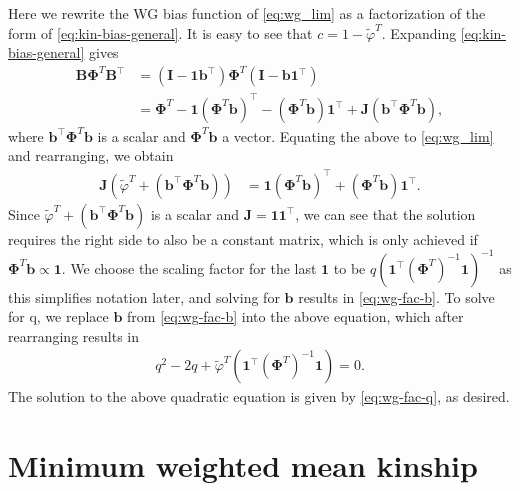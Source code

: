 \documentclass[9pt,twocolumn,twoside]{gsajnl}
\newcommand{\kinMat}[1][T]{\mathbf{\Phi}^{#1}}
\begin{document}
\begin{appendices}
  Here we rewrite the WG bias function of \cref{eq:wg_lim} as a factorization of the form of \cref{eq:kin-bias-general}.
  It is easy to see that $c = 1 - \tilde{\varphi}^T$.
  Expanding \cref{eq:kin-bias-general} gives
  \begin{align*}
    \mathbf{B} \kinMat \mathbf{B}^\intercal
    &= \left( \mathbf{I} - \mathbf{1} \mathbf{b}^\intercal \right) \kinMat \left( \mathbf{I} - \mathbf{b} \mathbf{1}^\intercal \right)
    \\
    &= \kinMat - \mathbf{1} \left( \kinMat \mathbf{b} \right)^\intercal - \left( \kinMat \mathbf{b} \right) \mathbf{1}^\intercal + \mathbf{J}(\mathbf{b}^\intercal \kinMat \mathbf{b} ),
  \end{align*} 
  where $\mathbf{b}^\intercal \kinMat \mathbf{b}$ is a scalar and $\kinMat\mathbf{b}$ a vector.
  Equating the above to \cref{eq:wg_lim} and rearranging, we obtain
  \begin{align*}
    \mathbf{J} \left( \tilde{\varphi}^T + \left( \mathbf{b}^\intercal \kinMat \mathbf{b} \right) \right)
    &= \mathbf{1} \left( \kinMat \mathbf{b} \right)^\intercal + \left( \kinMat\mathbf{b} \right) \mathbf{1}^\intercal .
  \end{align*}
  Since $\tilde{\varphi}^T + \left( \mathbf{b}^\intercal \kinMat \mathbf{b} \right)$ is a scalar and $\mathbf{J} = \mathbf{1} \mathbf{1}^\intercal$, we can see that the solution requires the right side to also be a constant matrix, which is only achieved if $\kinMat\mathbf{b} \propto \mathbf{1}$.
  We choose the scaling factor for the last $\mathbf{1}$ to be $q \left( \mathbf{1}^\intercal \left( \kinMat \right)^{-1} \mathbf{1} \right)^{-1}$ as this simplifies notation later, and solving for $\mathbf{b}$ results in \cref{eq:wg-fac-b}.
  To solve for q, we replace $\mathbf{b}$ from \cref{eq:wg-fac-b} into the above equation, which after rearranging results in
  \begin{align*}
    q^2 - 2q + \tilde{\varphi}^T \left( \mathbf{1}^\intercal \left( \kinMat \right)^{-1} \mathbf{1} \right) = 0.
  \end{align*}
  The solution to the above quadratic equation is given by \cref{eq:wg-fac-q}, as desired.

  \section{Minimum weighted mean kinship}

  \label{sec:min_w_mean_kin}


\end{appendices}
\end{document}

